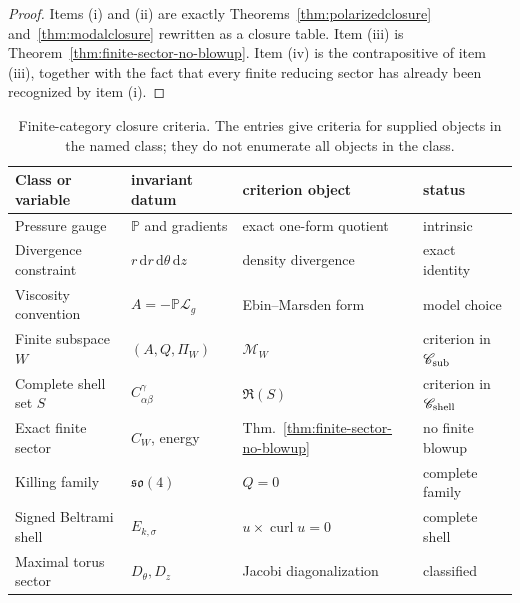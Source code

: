 \documentclass[aps,prd,reprint,superscriptaddress,nofootinbib,floatfix]{revtex4-2}
\theoremstyle{definition}
\theoremstyle{remark}
\newcommand{\dd}{\mathrm{d}}
\newcommand{\cL}{\mathcal{L}}
\newcommand{\cM}{\mathcal{M}}
\newcommand{\PP}{\mathbb{P}}
\begin{document}
\begin{proof}
	Items (i) and (ii) are exactly Theorems~\ref{thm:polarizedclosure} and~\ref{thm:modalclosure} rewritten as a closure table.  Item (iii) is Theorem~\ref{thm:finite-sector-no-blowup}.  Item (iv) is the contrapositive of item (iii), together with the fact that every finite reducing sector has already been recognized by item (i).
\end{proof}

\begin{table}[t]
	\caption{Finite-category closure criteria.  The entries give criteria for supplied objects in the named class; they do not enumerate all objects in the class.}
	\label{tab:finite-closure-table}
	\scriptsize
	\begin{tabular}{llll}
		\toprule
		Class or variable           & invariant datum                      & criterion object                        & status                               \\
		\midrule
		Pressure gauge              & \(\PP\) and gradients                & exact one-form quotient                & intrinsic                            \\
		Divergence constraint       & \(r\,\dd r\,\dd\theta\,\dd z\)       & density divergence                     & exact identity                       \\
		Viscosity convention        & \(A=-\PP\cL_g\)                      & Ebin--Marsden form                     & model choice                         \\
		Finite subspace \(W\)       & \((A,Q,\Pi_W)\)                      & \(\cM_W\)                              & criterion in \(\mathscr C_{\rm sub}\)   \\
		Complete shell set \(S\)    & \(C_{\alpha\beta}^{\gamma}\)         & \(\mathfrak R(S)\)                     & criterion in \(\mathscr C_{\rm shell}\) \\
		Exact finite sector         & \(C_W\), energy                      & Thm.~\ref{thm:finite-sector-no-blowup} & no finite blowup                     \\
		Killing family              & \(\mathfrak{so}(4)\)                 & \(Q=0\)                                & complete family                      \\
		Signed Beltrami shell       & \(E_{k,\sigma}\)                     & \(u\times\operatorname{curl}u=0\)      & complete shell                       \\
		Maximal torus sector        & \(D_\theta,D_z\)                     & Jacobi diagonalization                 & classified                           \\

\end{tabular}
\end{table}
\end{document}
